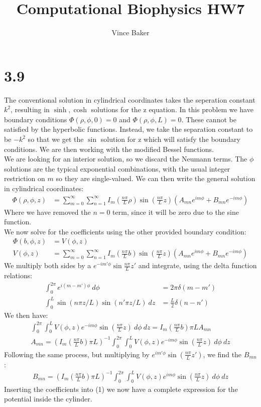 \documentclass[a4paper,11pt]{article}
\title{Computational Biophysics HW7}
\author{Vince Baker}
\numberwithin{equation}{section}
\newcommand{\lrp}[1]{\left({#1}\right)}
\begin{document}
\maketitle

\section{3.9}
The conventional solution in cylindrical coordinates takes the seperation constant $k^2$, resulting in $\sinh, \cosh$ solutions for the z equation.
In this problem we have boundary conditions $\Phi(\rho,\phi,0)=0$ and $\Phi(\rho,\phi,L)=0$.
These cannot be satisfied by the hyperbolic functions.
Instead, we take the separation constant to be $-k^2$ so that we get the $\sin$ solution for z which will satisfy the boundary conditions.
We are then working with the modified Bessel functions.\\
We are looking for an interior solution, so we discard the Neumann terms. 
The $\phi$ solutions are the typical exponential combinations, with the usual integer restriction on $m$ so they are single-valued.
We can then write the general solution in cylindrical coordinates:
\begin{align}
 \Phi(\rho,\phi,z) &= \sum_{m=0}^\infty \sum_{n=1}^\infty I_m(\frac{n\pi}{L}\rho)\sin{\lrp{\frac{n\pi}{L}z}}\lrp{A_{mn}e^{im\phi}+B_{mn}e^{-im\phi}}
\end{align}
Where we have removed the $n=0$ term, since it will be zero due to the sine function.\\
We now solve for the coefficients using the other provided boundary condition:
\begin{align}
 \Phi(b,\phi,z) &= V(\phi,z)\\
 V(\phi,z) &= \sum_{m=0}^\infty \sum_{n=1}^\infty I_m(\frac{n\pi}{L}b)\sin{\lrp{\frac{n\pi}{L}z}}\lrp{A_{mn}e^{im\phi}+B_{mn}e^{-im\phi}}
\end{align}
We multiply both sides by a $e^{-im'\phi}\sin{\frac{n\pi}{L}z'}$ and integrate, using the delta function relations:
\begin{align}
 \int_0^{2\pi} e^{i(m-m')\phi}\ d\phi &= 2\pi\delta(m-m')\\
 \int_0^L \sin(n\pi z/L)\sin(n'\pi z/L)\ dz &= \frac{L}{2}\delta(n-n')
\end{align}
We then have:
\begin{gather}
 \int_0^{2\pi} \int_0^L V(\phi,z)e^{-im\phi}\sin{\lrp{\frac{n\pi}{L}z}}\ d\phi\ dz =  I_m(\frac{n\pi}{L}b) \pi L A_{mn}\\
 A_{mn} = \lrp{I_m(\frac{n\pi}{L}b) \pi L}^{-1} \int_0^{2\pi} \int_0^L V(\phi,z)e^{-im\phi}\sin{\lrp{\frac{n\pi}{L}z}}\ d\phi\ dz
\end{gather}
Following the same process, but multiplying by $e^{im'\phi}\sin{\lrp{\frac{n\pi}{L}z'}}$, we find the $B_{mn}$:
\begin{gather}
 B_{mn} = \lrp{I_m(\frac{n\pi}{L}b) \pi L}^{-1} \int_0^{2\pi} \int_0^L V(\phi,z)e^{im\phi}\sin{\lrp{\frac{n\pi}{L}z}}\ d\phi\ dz
\end{gather}
Inserting the coefficients into (1) we now have a complete expression for the potential inside the cylinder.
\end{document}
